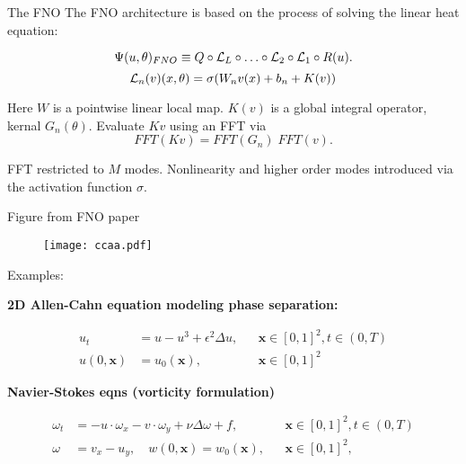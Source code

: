 \documentclass{beamer}
\begin{document}
\begin{frame}{The FNO}
The {\color{purple} FNO architecture} is based on the process of solving the linear heat equation:

$$\Psi(u,\theta)_{FNO} \equiv Q \circ {\cal L}_L \circ \ldots \circ {\cal L}_2 \circ {\cal L}_1 \circ R(u).$$
$${\cal L}_n(v)(x,\theta) = \sigma(W_n v(x) + b_n + K(v))$$

\vspace{0.1in}

Here $W$ is a {\color{blue} pointwise linear local map}.  $K(v)$ is a {\color{blue} global integral operator}, kernal $G_n(\theta)$.  Evaluate $Kv$ using an {\color{blue} FFT} via
$$FFT(Kv) = FFT(G_n) \; FFT(v).$$

\vspace{0.1in}


FFT restricted to $M$ modes. Nonlinearity and {\color{blue} higher order modes}  introduced via the {\color{blue} activation function} $\sigma$.

\end{frame}

\begin{frame}{Figure from FNO paper}
    \begin{figure}
    \centering
     \texttt{[image: ccaa.pdf]}
    \end{figure}
\end{frame}

\begin{frame}{Examples:}



{\bf 2D Allen-Cahn equation modeling phase separation:}

{\color{blue}
\begin{equation}
\begin{aligned}
    u_t &= u - u^3 + \epsilon^2\Delta u, && \mathbf{x}\in[0,1]^2, t\in(0,T)\\
    u(0,\mathbf{x}) &= u_0(\mathbf{x}), && \mathbf{x}\in[0,1]^2
\end{aligned}
\end{equation}
}

\vspace{0.2in}

{\bf Navier-Stokes eqns (vorticity formulation)}

{\color{blue}
\begin{equation}
    \begin{aligned}
    \omega_t &= - u\cdot\omega_x - v\cdot\omega_y + \nu\Delta\omega + f, && \mathbf{x}\in[0,1]^2, t\in(0,T)\\
    \omega &= v_x - u_y, \quad w(0,\mathbf{x}) = w_0(\mathbf{x}), && \mathbf{x}\in[0,1]^2,
\end{aligned}
\end{equation}

}

\end{frame}
\end{document}
